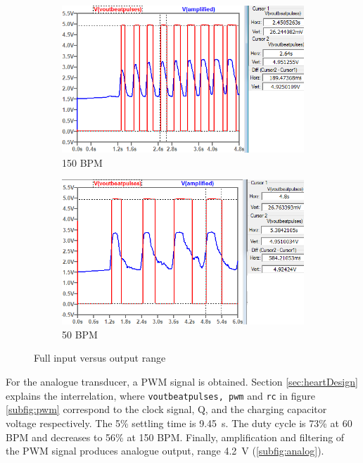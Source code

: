 \begin{figure}[h]
 \footnotesize
   \centering
   \begin{subfigure}[]{0.49\textwidth} 	 
  	 \includegraphics[width=\linewidth]{./Figures/pulses2}
	  \caption{150 BPM} 
	  \label{subfig:pulses2}	
   \end{subfigure}
   \begin{subfigure}[]{0.49\textwidth}
        \includegraphics[width=\linewidth]{./Figures/pulses1}
	  \caption{50 BPM} 
	  \label{subfig:pulses1}	
   \end{subfigure}
   \caption{Full input versus output range}
 \end{figure}

\pagebreak
For the analogue transducer, a PWM signal is obtained. Section \ref{sec:heartDesign} explains the interrelation, where \texttt{voutbeatpulses, pwm} and \texttt{rc} in figure \ref{subfig:pwm} correspond to the clock signal, Q, and the charging capacitor voltage respectively. The 5\% settling time is \SI{9.45}{s}. The duty cycle is 73\% at 60 BPM and decreases to 56\% at 150 BPM. Finally, amplification and filtering of the PWM signal produces analogue output, range \SI{4.2}{V} (\ref{subfig:analog}).


